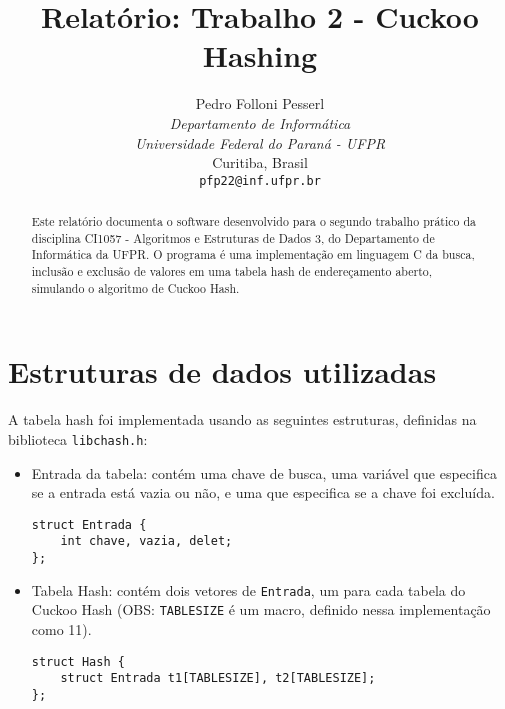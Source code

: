 \documentclass[a4paper, 11pt]{article}
\title{Relatório: Trabalho 2 - Cuckoo Hashing}
\author{Pedro Folloni Pesserl\\
\textit{Departamento de Informática}\\
\textit{Universidade Federal do Paraná - UFPR}\\
Curitiba, Brasil\\
\texttt{pfp22@inf.ufpr.br}}
\date{}
\begin{document}
\maketitle

\begin{abstract}
\begin{singlespace}
Este relatório documenta o software desenvolvido para o segundo trabalho prático da
disciplina CI1057 - Algoritmos e Estruturas de Dados 3, do Departamento de Informática
da UFPR. O programa é uma implementação em linguagem C da busca, inclusão e exclusão
de valores em uma tabela hash de endereçamento aberto, simulando o algoritmo de
Cuckoo Hash.
\end{singlespace}
\end{abstract}

\section{Estruturas de dados utilizadas}
A tabela hash foi implementada usando as seguintes estruturas, definidas na biblioteca
\texttt{libchash.h}:
\begin{itemize}
    \item Entrada da tabela: contém uma chave de busca, uma variável que especifica se
        a entrada está vazia ou não, e uma que especifica se a chave foi excluída.
    \begin{verbatim}
struct Entrada {
    int chave, vazia, delet;
};
    \end{verbatim}

\item Tabela Hash: contém dois vetores de \texttt{Entrada}, um para cada tabela do Cuckoo
        Hash (OBS: \texttt{TABLESIZE} é um macro, definido nessa implementação como 11).
    \begin{verbatim}
struct Hash {
    struct Entrada t1[TABLESIZE], t2[TABLESIZE];
};
    \end{verbatim}
\end{itemize}
\end{document}
